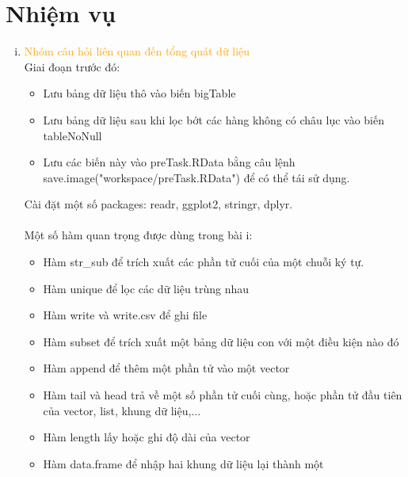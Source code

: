 \documentclass[a4paper]{article}
\theoremstyle{definition}
\begin{document}
	\section{Nhiệm vụ}\label{requirement} 
	\begin{enumerate}[i)]
		\item \textcolor{orange}{Nhóm câu hỏi liên quan đến tổng quát dữ liệu}\\
	Giai đoạn trước đó:\\
	    \begin{itemize}
    \item Lưu bảng dữ liệu thô vào biến bigTable\\
    \item Lưu bảng dữ liệu sau khi lọc bớt các hàng không có châu lục vào biến tableNoNull\\
    \item Lưu các biến này vào preTask.RData bằng câu lệnh save.image("workspace/preTask.RData") để có thể tái sử dụng.\\
        \end{itemize}
    Cài đặt một số packages: readr, ggplot2, stringr, dplyr.\\
    \\
    Một số hàm quan trọng được dùng trong bài i:\\
        \begin{itemize}
    \item Hàm str\_sub để trích xuất các phần tử cuối của một chuỗi ký tự.\\
    \item Hàm unique để lọc các dữ liệu trùng nhau\\
    \item Hàm write và write.csv để ghi file\\
    \item Hàm subset để trích xuất một bảng dữ liệu con với một điều kiện nào đó\\
    \item Hàm append để thêm một phần tử vào một vector\\
    \item Hàm tail và head trả về một số phần tử cuối cùng, hoặc phần tử đầu tiên của vector, list, khung dữ liệu,...\\
    \item Hàm length lấy hoặc ghi độ dài của vector\\
    \item Hàm data.frame để nhập hai khung dữ liệu lại thành một\\

\end{itemize}
\end{enumerate}
\end{document}
